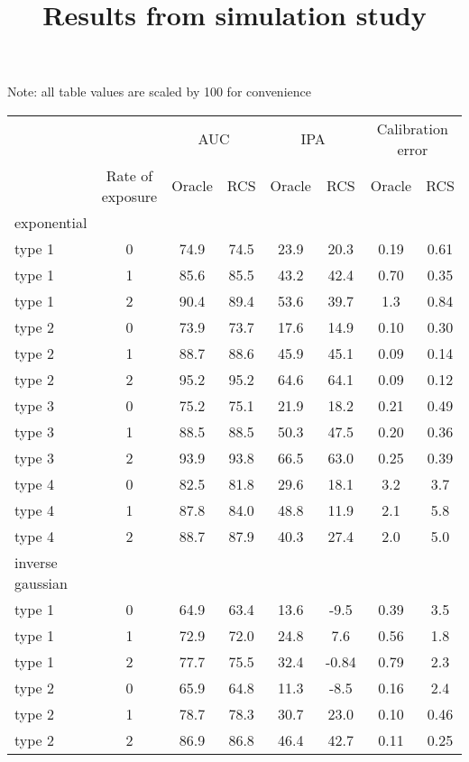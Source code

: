 \documentclass[
]{article}
\title{Results from simulation study}
\author{}
\date{\vspace{-2.5em}}
\begin{document}
\maketitle

Note: all table values are scaled by 100 for convenience

\captionsetup[table]{labelformat=empty,skip=1pt}
\begin{longtable}{lccccccc}
\toprule
& & \multicolumn{2}{c}{AUC} & \multicolumn{2}{c}{IPA} & \multicolumn{2}{c}{Calibration error} \\ 
 \cmidrule(lr){3-4}\cmidrule(lr){5-6}\cmidrule(lr){7-8}
 & Rate of exposure & Oracle & RCS & Oracle & RCS & Oracle & RCS \\ 
\midrule
\multicolumn{1}{l}{exponential} \\ 
\midrule
type 1 & 0 & 74.9 & 74.5 & 23.9 & 20.3 & 0.19 & 0.61 \\ 
type 1 & 1 & 85.6 & 85.5 & 43.2 & 42.4 & 0.70 & 0.35 \\ 
type 1 & 2 & 90.4 & 89.4 & 53.6 & 39.7 & 1.3 & 0.84 \\ 
type 2 & 0 & 73.9 & 73.7 & 17.6 & 14.9 & 0.10 & 0.30 \\ 
type 2 & 1 & 88.7 & 88.6 & 45.9 & 45.1 & 0.09 & 0.14 \\ 
type 2 & 2 & 95.2 & 95.2 & 64.6 & 64.1 & 0.09 & 0.12 \\ 
type 3 & 0 & 75.2 & 75.1 & 21.9 & 18.2 & 0.21 & 0.49 \\ 
type 3 & 1 & 88.5 & 88.5 & 50.3 & 47.5 & 0.20 & 0.36 \\ 
type 3 & 2 & 93.9 & 93.8 & 66.5 & 63.0 & 0.25 & 0.39 \\ 
type 4 & 0 & 82.5 & 81.8 & 29.6 & 18.1 & 3.2 & 3.7 \\ 
type 4 & 1 & 87.8 & 84.0 & 48.8 & 11.9 & 2.1 & 5.8 \\ 
type 4 & 2 & 88.7 & 87.9 & 40.3 & 27.4 & 2.0 & 5.0 \\ 
\midrule
\multicolumn{1}{l}{inverse gaussian} \\ 
\midrule
type 1 & 0 & 64.9 & 63.4 & 13.6 & -9.5 & 0.39 & 3.5 \\ 
type 1 & 1 & 72.9 & 72.0 & 24.8 & 7.6 & 0.56 & 1.8 \\ 
type 1 & 2 & 77.7 & 75.5 & 32.4 & -0.84 & 0.79 & 2.3 \\ 
type 2 & 0 & 65.9 & 64.8 & 11.3 & -8.5 & 0.16 & 2.4 \\ 
type 2 & 1 & 78.7 & 78.3 & 30.7 & 23.0 & 0.10 & 0.46 \\ 
type 2 & 2 & 86.9 & 86.8 & 46.4 & 42.7 & 0.11 & 0.25 \\ 

\end{longtable}
\end{document}
